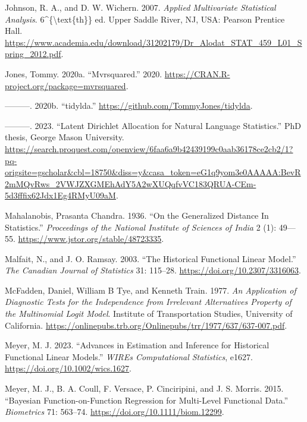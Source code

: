 \begin{CSLReferences}{1}{0}
\leavevmode{}%
Johnson, R. A., and D. W. Wichern. 2007. \emph{Applied Multivariate Statistical Analysis}. 6\^{}\{\textbackslash text\{th\}\} ed. Upper Saddle River, NJ, USA: Pearson Prentice Hall. \url{https://www.academia.edu/download/31202179/Dr_Alodat_STAT_459_L01_Spring_2012.pdf}.

\leavevmode{}%
Jones, Tommy. 2020a. {``Mvrsquared.''} 2020. \url{https://CRAN.R-project.org/package=mvrsquared}.

\leavevmode{}%
---------. 2020b. {``{tidylda}.''} \url{https://github.com/TommyJones/tidylda}.

\leavevmode{}%
---------. 2023. {``Latent Dirichlet Allocation for Natural Language Statistics.''} PhD thesis, George Mason University. \url{https://search.proquest.com/openview/6faa6a9b42439199c0aab36178ce2cb2/1?pq-origsite=gscholar\&cbl=18750\&diss=y\&casa_token=eG1q9yom3e0AAAAA:BevR2mMQvRws_2VWJZXGMEhAdY5A2wXUQqfvVC183QRUA-CEm-5d3fffix62Jdx1Eg4RMyU09aM}.

\leavevmode{}%
Mahalanobis, Prasanta Chandra. 1936. {``{On the Generalized Distance In Statistics}.''} \emph{Proceedings of the National Institute of Sciences of India} 2 (1): 49---55. \url{https://www.jstor.org/stable/48723335}.

\leavevmode{}%
Malfait, N., and J. O. Ramsay. 2003. {``The Historical Functional Linear Model.''} \emph{The Canadian Journal of Statistics} 31: 115--28. \url{https://doi.org/10.2307/3316063}.

\leavevmode{}%
McFadden, Daniel, William B Tye, and Kenneth Train. 1977. \emph{An Application of Diagnostic Tests for the Independence from Irrelevant Alternatives Property of the Multinomial Logit Model}. Institute of Transportation Studies, University of California. \url{https://onlinepubs.trb.org/Onlinepubs/trr/1977/637/637-007.pdf}.

\leavevmode{}%
Meyer, M. J. 2023. {``Advances in Estimation and Inference for Historical Functional Linear Models.''} \emph{WIREs Computational Statistics}, e1627. \url{https://doi.org/10.1002/wics.1627}.

\leavevmode{}%
Meyer, M. J., B. A. Coull, F. Versace, P. Cinciripini, and J. S. Morris. 2015. {``Bayesian Function-on-Function Regression for Multi-Level Functional Data.''} \emph{Biometrics} 71: 563--74. \url{https://doi.org/10.1111/biom.12299}.


\end{CSLReferences}
